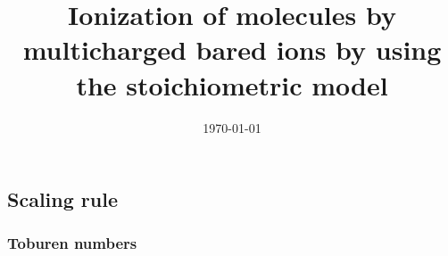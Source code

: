 \documentclass[preprint,12pt]{article}
\begin{document}
\title{Ionization of molecules by multicharged bared ions by using the
stoichiometric model}

\date{\today }

\maketitle

\begin{abstract}
\end{abstract}




\subsection{Scaling rule}

\subsubsection{Toburen numbers}
\end{document}
